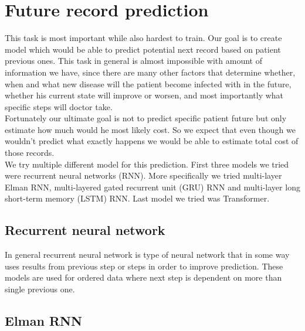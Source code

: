 
\section{Future record prediction}
\label{record_prediction}

This task is most important while also hardest to train. Our goal is to create model which would be able to predict potential next record based on patient previous ones. This task in general is almost impossible with amount of information we have, since there are many other factors that determine whether, when and what new disease will the patient become infected with in the future, whether his current state will improve or worsen, and most importantly what specific steps will doctor take.
\\

Fortunately our ultimate goal is not to predict specific patient future but only estimate how much would he most likely cost. So we expect that even though we wouldn't predict what exactly happens we would be able to estimate total cost of those records.
\\

We try multiple different model for this prediction. First three models we tried were recurrent neural networks (RNN). More specifically we tried multi-layer Elman RNN, multi-layered gated recurrent unit (GRU) RNN and multi-layer long short-term memory (LSTM) RNN. Last model we tried was Transformer.
\\

\subsection{Recurrent neural network}

In general recurrent neural network is type of neural network that in some way uses results from previous step or steps in order to improve prediction. These models are used for ordered data where next step is dependent on more than single previous one.

\subsection{Elman RNN}

